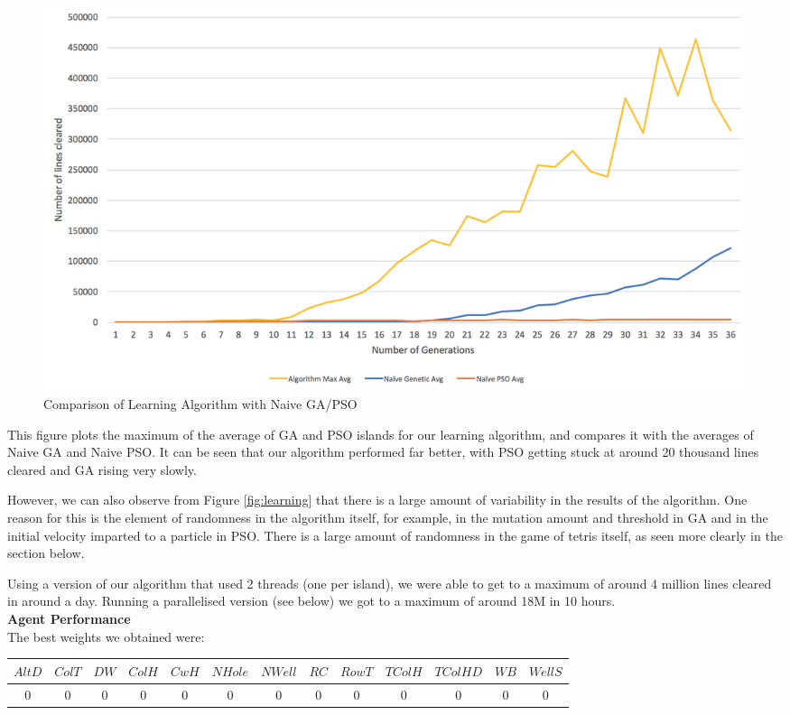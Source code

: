 \documentclass[12pt]{article}
\begin{document}
	\begin{figure}[H]
		\includegraphics[scale=0.3]{learning/Naive}
		\centering
		\caption{Comparison of Learning Algorithm with Naive GA/PSO}
		\label{fig:naive}
	\end{figure}

	This figure plots the maximum of the average of GA and PSO islands for
	our learning algorithm, and compares it with the averages of Naive GA and
	Naive PSO. It can be seen that our algorithm performed far better, with PSO
	getting stuck at around 20 thousand lines cleared and GA rising very slowly.

	However, we can also observe from Figure \ref{fig:learning} that there is a large amount
	of variability in the results of the algorithm. One reason for this is the element
	of randomness in the algorithm itself, for example, in the mutation amount and threshold
	in GA and in the initial velocity imparted to a particle in PSO. There is
	a large amount of randomness in the game of tetris itself, as seen more clearly
	in the section below.

	Using a version of our algorithm that used 2 threads (one per island),
	we were able to get to a maximum of around 4 million lines cleared in
	around a day. Running a parallelised version (see below) we got to a maximum of
	around 18M in 10 hours.\\

	\textbf{Agent Performance}\\
	The best weights we obtained were:\\

	\vspace{-2mm}
	\begin{tabular}{ | c | c | c | c | c | c | c | c | c | c | c | c | c | }
		\hline
		$AltD$ & $ColT$ & $DW$ & $ColH$ & $CwH$ & $NHole$ & $NWell$ & $RC$ & $RowT$ & $TColH$ & $TColHD$ & $WB$ & $WellS$ \\ \hline
		0 & 0 & 0 & 0 & 0 & 0 & 0 & 0 & 0 & 0 & 0 & 0 & 0 \\ \hline
	\end{tabular}\\[0.25em]
\end{document}
